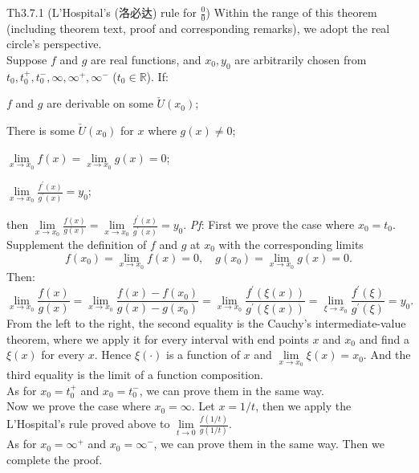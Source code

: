 \documentclass{article}
\begin{document}
\begin{Th}{Th3.7.1 (L'Hospital's (洛必达) rule for $\frac{0}{0}$)}
    Within the range of this theorem (including theorem text, proof and corresponding remarks), we adopt the real circle's perspective.\\
    Suppose $f$ and $g$ are real functions, and $x_0, y_0$ are arbitrarily chosen from $t_0, t_0^+, t_0^-, \infty, \infty^+, \infty^-$ ($t_0\in\mathbb{R}$). If:
    \begin{compactenum}
        \item $f$ and $g$ are derivable on some $\check{U}(x_0)$;
        \item There is some $\check{U}(x_0)$ for $x$ where $g(x)\neq 0$;
        \item $\lim\limits_{x\to x_0} f(x) = \lim\limits_{x\to x_0} g(x) = 0$;
        \item $\lim\limits_{x\to x_0} \frac{f^\prime(x)}{g^\prime(x)} = y_0$;
    \end{compactenum}
    then $\lim\limits_{x\to x_0} \frac{f(x)}{g(x)} = \lim\limits_{x\to x_0} \frac{f^\prime(x)}{g^\prime(x)} = y_0$.
    \tcblower
    \textit{Pf}: First we prove the case where $x_0 = t_0$. Supplement the definition of $f$ and $g$ at $x_0$ with the corresponding limits
    $$ f(x_0) = \lim\limits_{x\to x_0} f(x) = 0, \quad g(x_0) = \lim\limits_{x\to x_0} g(x) = 0. $$
    Then:
    $$ \lim\limits_{x\to x_0} \frac{f(x)}{g(x)} = \lim\limits_{x\to x_0} \frac{f(x)-f(x_0)}{g(x)-g(x_0)} = \lim\limits_{x\to x_0} \frac{f^\prime(\xi(x))}{g^\prime(\xi(x))} = \lim\limits_{\xi\to x_0} \frac{f^\prime(\xi)}{g^\prime(\xi)} = y_0. $$
    From the left to the right, the second equality is the Cauchy's intermediate-value theorem, where we apply it for every interval with end points $x$ and $x_0$ and find a $\xi(x)$ for every $x$. Hence $\xi(\cdot)$ is a function of $x$ and $\lim\limits_{x\to x_0} \xi(x) = x_0$. And the third equality is the limit of a function composition. \\
    As for $x_0=t_0^+$ and $x_0=t_0^-$, we can prove them in the same way.\\
    Now we prove the case where $x_0 = \infty$. Let $x = 1/t$, then we apply the L'Hospital's rule proved above to $\lim\limits_{t\to 0} \frac{f(1/t)}{g(1/t)}$.\\
    As for $x_0 = \infty^+$ and $x_0 = \infty^-$, we can prove them in the same way. Then we complete the proof.
\end{Th}
\end{document}
